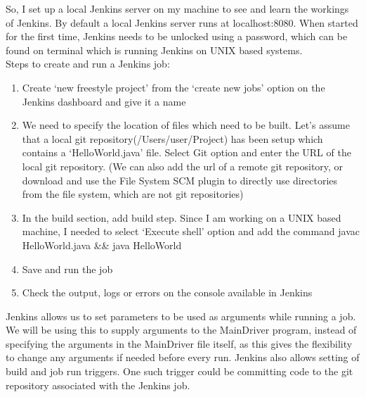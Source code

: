 So, I set up a local Jenkins server on my machine to see and learn the workings of Jenkins. By default a local Jenkins server runs at localhost:8080. When started for the first time, Jenkins needs to be unlocked using a password, which can be found on terminal which is running Jenkins on UNIX based systems.\\

Steps to create and run a Jenkins job:
\begin{enumerate}
	\item Create `new freestyle project' from the `create new jobs' option on the Jenkins dashboard and give it a name
	\item We need to specify the location of files which need to be built. Let's assume that a local git repository(/Users/user/Project) has been setup which contains a `HelloWorld.java' file. Select Git option and enter the URL of the local git repository. (We can also add the url of a remote git repository, or download and use the File System SCM plugin to directly use directories from the file system, which are not git repositories)
	\item In the build section, add build step. Since I am working on a UNIX based machine, I needed to select `Execute shell' option and add the command javac HelloWorld.java \&\& java HelloWorld
	\item Save and run the job
	\item Check the output, logs or errors on the console available in Jenkins
\end{enumerate}
Jenkins allows us to set parameters to be used as arguments while running a job. We will be using this to supply arguments to the MainDriver program, instead of specifying the arguments in the MainDriver file itself, as this gives the flexibility to change any arguments if needed before every run. Jenkins also allows setting of build and job run triggers. One such trigger could be committing code to the git repository associated with the Jenkins job.

